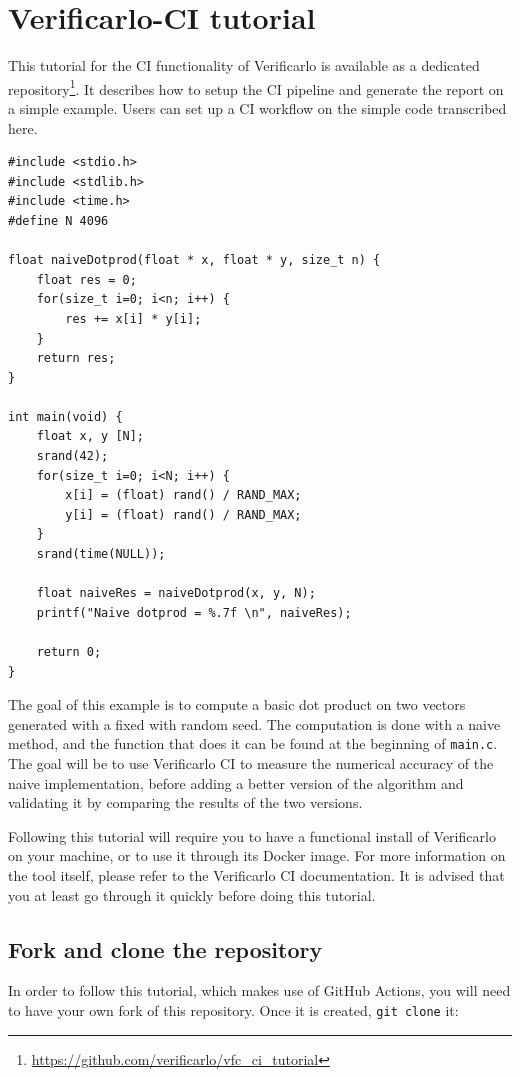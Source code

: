 \newpage
\appendix
\section{Verificarlo-CI tutorial}
This tutorial for the CI functionality of Verificarlo is available as a
dedicated
repository\footnote{\url{https://github.com/verificarlo/vfc_ci_tutorial}}.
It describes how to setup the CI pipeline and generate the report on a simple
example.  Users can set up a CI workflow on the simple code transcribed here.

\begin{verbatim}
#include <stdio.h>
#include <stdlib.h>
#include <time.h>
#define N 4096

float naiveDotprod(float * x, float * y, size_t n) {
	float res = 0;
	for(size_t i=0; i<n; i++) {
		res += x[i] * y[i];
	}
	return res;
}

int main(void) {
	float x, y [N];
	srand(42);
	for(size_t i=0; i<N; i++) {
		x[i] = (float) rand() / RAND_MAX;
		y[i] = (float) rand() / RAND_MAX;
	}
	srand(time(NULL));

	float naiveRes = naiveDotprod(x, y, N);
	printf("Naive dotprod = %.7f \n", naiveRes);

	return 0;
}
\end{verbatim}

The goal of this example is to compute a basic dot product on two vectors
generated with a fixed with random seed. The computation is done with a naive
method, and the function that does it can be found at the beginning of \texttt{main.c}.
The goal will be to use Verificarlo CI to measure the numerical accuracy of the
naive implementation, before adding a better version of the algorithm and
validating it by comparing the results of the two versions.

Following this tutorial will require you to have a functional install of
Verificarlo on your machine, or to use it through its Docker image. For more
information on the tool itself, please refer to the Verificarlo CI
documentation. It is advised that you at least go through it quickly before
doing this tutorial.

\subsection{Fork and clone the repository}

In order to follow this tutorial, which makes use of GitHub Actions, you will
need to have your own fork of this repository. Once it is created,
\texttt{git clone} it:



